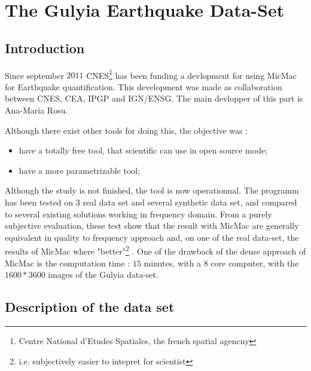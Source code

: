


\section{The Gulyia Earthquake Data-Set}

\label{Gulya}

\subsection{Introduction}

Since september $2011$ CNES\footnote{Centre National d'Etudes Spatiales, the french spatial agencny}
has been funding a devlopment for using MicMac for  Earthquake quantification. This development
was made as collaboration between CNES, CEA, IPGP and IGN/ENSG. The main devlopper of this part
is Ana-Maria Rosu.

Although there exist other tools for doing this, the objective was :

\begin{itemize}
   \item have a totally free tool, that scientific can use in open source mode;
   \item have a more parametrizable tool;
\end{itemize}

Although the study is not finished, the tool  is now operationnal. The programm has been
tested on $3$ real data set and several synthetic data set, and compared to several existing solutions 
working in frequency domain. From a purely subjective evaluation, these test show that the
result with MicMac are generally equivalent in quality to frequency approach and, on one of the
real data-set, the results of MicMac where "better"\footnote{i.e. subjectively easier to intepret
for scientist} . One of the drawback of the dense approach of
MicMac is the computation time : $15$ minutes, with a $8$ core computer, with the $1600*3600$
images of the Gulyia data-set.



\subsection{Description of the data set}

